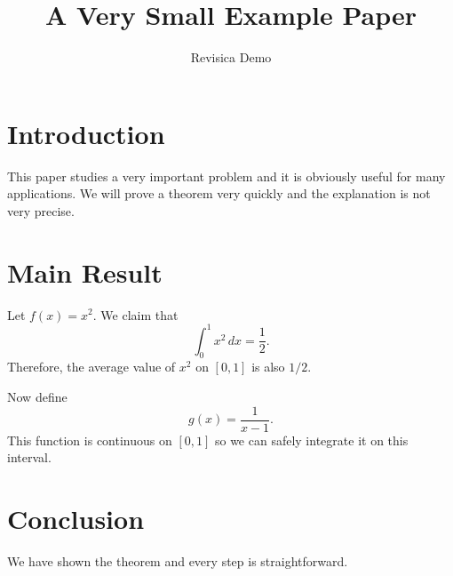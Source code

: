 \documentclass{article}
\title{A Very Small Example Paper}
\author{Revisica Demo}
\date{}
\begin{document}
\maketitle

\section{Introduction}
This paper studies a very important problem and it is obviously useful for many applications.
We will prove a theorem very quickly and the explanation is not very precise.

\section{Main Result}
Let $f(x) = x^2$. We claim that
\[
\int_0^1 x^2 \, dx = \frac{1}{2}.
\]
Therefore, the average value of $x^2$ on $[0,1]$ is also $1/2$.

Now define
\[
g(x) = \frac{1}{x-1}.
\]
This function is continuous on $[0,1]$ so we can safely integrate it on this interval.

\section{Conclusion}
We have shown the theorem and every step is straightforward.
\end{document}

